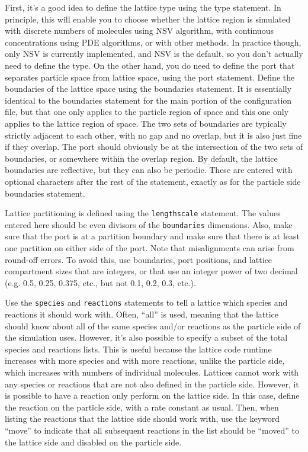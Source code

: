 \documentclass {scrbook}
\newcommand {\ttt} {\texttt}
\begin{document}
First, it's a good idea to define the lattice type using the type statement. In principle, this will enable you to choose whether the lattice region is simulated with discrete numbers of molecules using NSV algorithm, with continuous concentrations using PDE algorithms, or with other methods. In practice though, only NSV is currently implemented, and NSV is the default, so you don't actually need to define the type. On the other hand, you do need to define the port that separates particle space from lattice space, using the port statement.
Define the boundaries of the lattice space using the boundaries statement. It is essentially identical to the boundaries statement for the main portion of the configuration file, but that one only applies to the particle region of space and this one only applies to the lattice region of space. The two sets of boundaries are typically strictly adjacent to each other, with no gap and no overlap, but it is also just fine if they overlap. The port should obviously be at the intersection of the two sets of boundaries, or somewhere within the overlap region. By default, the lattice boundaries are reflective, but they can also be periodic. These are entered with optional characters after the rest of the statement, exactly as for the particle side boundaries statement.

Lattice partitioning is defined using the \ttt{lengthscale} statement. The values entered here should be even divisors of the \ttt{boundaries} dimensions. Also, make sure that the port is at a partition boundary and make sure that there is at least one partition on either side of the port. Note that misalignments can arise from round-off errors. To avoid this, use boundaries, port positions, and lattice compartment sizes that are integers, or that use an integer power of two decimal (e.g. 0.5, 0.25, 0.375, etc., but not 0.1, 0.2, 0.3, etc.).

Use the \ttt{species} and \ttt{reactions} statements to tell a lattice which species and reactions it should work with. Often, ``all'' is used, meaning that the lattice should know about all of the same species and/or reactions as the particle side of the simulation uses. However, it's also possible to specify a subset of the total species and reactions lists. This is useful because the lattice code runtime increases with more species and with more reactions, unlike the particle side, which increases with numbers of individual molecules. Lattices cannot work with any species or reactions that are not also defined in the particle side. However, it is possible to have a reaction only perform on the lattice side. In this case, define the reaction on the particle side, with a rate constant as usual. Then, when listing the reactions that the lattice side should work with, use the keyword ``move'' to indicate that all subsequent reactions in the list should be ``moved'' to the lattice side and disabled on the particle side.
\end{document}
